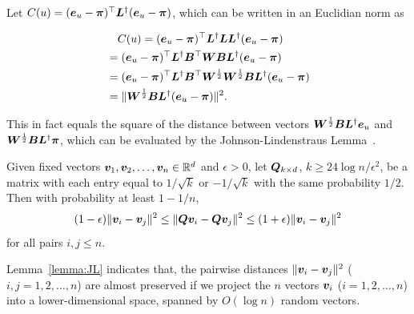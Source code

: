 \documentclass[journal]{IEEEtran}
\begin{document}
Let \(C(u)=(\boldsymbol{e}_u - \boldsymbol{\pi})^{\top} \boldsymbol{L}^{\dagger} (\boldsymbol{e}_u- \boldsymbol{\pi})\), which can be written in an Euclidian norm as
\begin{small}
    \begin{equation}\label{EE12}
        \begin{split}
            &\quad C(u)=(\boldsymbol{e}_u - \boldsymbol{\pi})^{\top} \boldsymbol{L}^{\dagger} \boldsymbol{L} \boldsymbol{L}^{\dagger} (\boldsymbol{e}_u - \boldsymbol{\pi}) \\
            &=(\boldsymbol{e}_u - \boldsymbol{\pi})^{\top} \boldsymbol{L}^{\dagger} \boldsymbol{B}^{\top} \boldsymbol{W} \boldsymbol{B} \boldsymbol{L}^{\dagger} (\boldsymbol{e}_u - \boldsymbol{\pi}) \\
            &=(\boldsymbol{e}_u - \boldsymbol{\pi})^{\top} \boldsymbol{L}^{\dagger} \boldsymbol{B}^{\top} \boldsymbol{W}^{\frac{1}{2}} \boldsymbol{W}^{\frac{1}{2}} \boldsymbol{B} \boldsymbol{L}^{\dagger} (\boldsymbol{e}_u - \boldsymbol{\pi}) \\
            &=\|\boldsymbol{W}^{\frac{1}{2}} \boldsymbol{B} \boldsymbol{L}^{\dagger} (\boldsymbol{e}_u - \boldsymbol{\pi})\|^2.
        \end{split}
    \end{equation}
\end{small}
This  in fact  equals the square of the distance between  vectors  \(\boldsymbol{W}^{\frac{1}{2}} \boldsymbol{B} \boldsymbol{L}^{\dagger} \boldsymbol{e}_u\) and \(\boldsymbol{W}^{\frac{1}{2}} \boldsymbol{B} \boldsymbol{L}^{\dagger} \boldsymbol{\pi}\), which can be evaluated by the Johnson-Lindenstraus
Lemma~\cite{Ac01}.
\begin{lemma}%
    \label{lemma:JL}
    Given fixed vectors \(\boldsymbol{v}_1,\boldsymbol{v}_2,\ldots,\boldsymbol{v}_n\in \mathbb{R}^d\) and
    \(\epsilon>0\), let
    \(\boldsymbol{Q}_{k\times d}\),  \(k\ge 24\log n/\epsilon^2\), be a matrix with each  entry equal  to \(1/\sqrt{k}\) or \(- 1/\sqrt{k}\)  with the same probability \(1/2\). Then with probability at least \(1-1/n\),
    \[(1-\epsilon)\|\boldsymbol{v}_i-\boldsymbol{v}_j\|^2\le \|\boldsymbol{Q} \boldsymbol{v}_i-\boldsymbol{Q} \boldsymbol{v}_j\|^2\le
        (1+\epsilon)\|\boldsymbol{v}_i-\boldsymbol{v}_j\|^2\] for all pairs \(i,j\le n\).
\end{lemma}
Lemma~\ref{lemma:JL} indicates that,  the pairwise distances \(\|\boldsymbol{v}_i-\boldsymbol{v}_j\|^2\) (\(i,j=1,2,\ldots, n\)) are almost preserved if we
project the \(n\) vectors \(\boldsymbol{v}_i\) (\(i=1,2,\ldots, n\))  into a lower-dimensional space, spanned
by \(O(\log n)\) random vectors.
\end{document}
